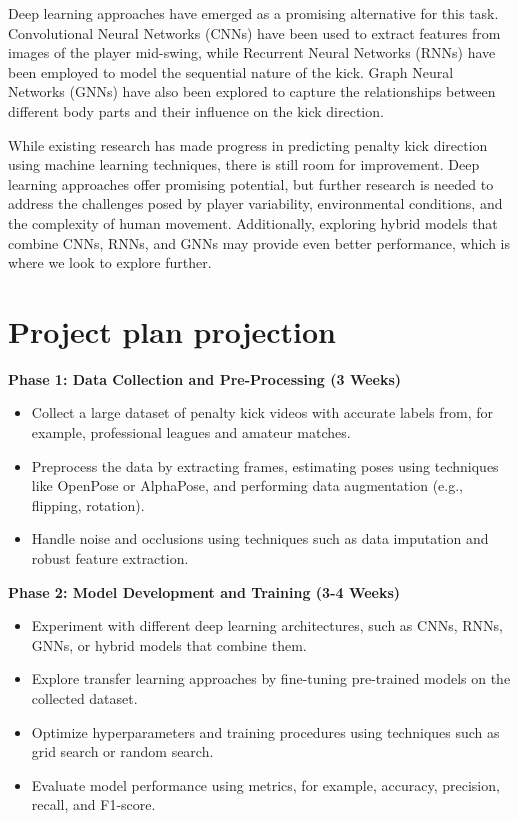 \documentclass{article}
\begin{document}
Deep learning approaches have emerged as a promising alternative for this task. Convolutional Neural Networks (CNNs) have been used to extract features from images of the player mid-swing, while Recurrent Neural Networks (RNNs) have been employed to model the sequential nature of the kick. Graph Neural Networks (GNNs) have also been explored to capture the relationships between different body parts and their influence on the kick direction.


While existing research has made progress in predicting penalty kick direction using machine learning techniques, there is still room for improvement. Deep learning approaches offer promising potential, but further research is needed to address the challenges posed by player variability, environmental conditions, and the complexity of human movement. Additionally, exploring hybrid models that combine CNNs, RNNs, and GNNs may provide even better performance, which is where we look to explore further.




\section{Project plan projection}

{\bf{Phase 1: Data Collection and Pre-Processing (3 Weeks)}}
\begin{itemize}
    \item Collect a large dataset of penalty kick videos with accurate labels from, for example, professional leagues and amateur matches.
    \item Preprocess the data by extracting frames, estimating poses using techniques like OpenPose or AlphaPose, and performing data augmentation (e.g., flipping, rotation).
    \item Handle noise and occlusions using techniques such as data imputation and robust feature extraction.
\end{itemize}

{\bf{Phase 2: Model Development and Training (3-4 Weeks)}}
\begin{itemize}
    \item Experiment with different deep learning architectures, such as CNNs, RNNs, GNNs, or hybrid models that combine them.
    \item Explore transfer learning approaches by fine-tuning pre-trained models on the collected dataset.
    \item Optimize hyperparameters and training procedures using techniques such as grid search or random search.
    \item Evaluate model performance using metrics, for example, accuracy, precision, recall, and F1-score.
\end{itemize}
\end{document}
